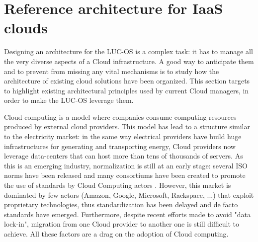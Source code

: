 \section{Reference architecture for IaaS clouds}
\label{sec:moreno}

Designing an architecture for the LUC-OS is a complex task: it has to manage all
the very diverse aspects of a Cloud infrastructure. A good way to anticipate 
them and to prevent from missing any vital mechanisms is to study how the 
architecture of existing cloud solutions have been organized. This section 
targets to highlight existing architectural principles used by current Cloud 
managers, in order to make the LUC-OS leverage them.


Cloud computing is a model where companies consume computing resources produced 
by external cloud providers. This model has lead to a structure similar to the 
electricity market: in the same way electrical providers have build huge 
infrastructures for generating and transporting energy, Cloud providers now 
leverage data-centers that can host more than tens of thousands of servers. As 
this is an emerging industry, normalization is still at an early stage: several 
ISO norms have been released \cite{ISO:2009:DAPS} and many consortiums have been
created to promote the use of standards by Cloud Computing actors 
\cite{marston:cloud2011}. However, this market is dominated by few actors 
(Amazon, Google, Microsoft, Rackspace, ...) that exploit proprietary 
technologies, thus standardization has been delayed and de facto standards have 
emerged. Furthermore, despite recent efforts made to avoid "data lock-in", 
migration from one Cloud provider to another one is still difficult to achieve. 
All these factors are a drag on the adoption of Cloud computing.

